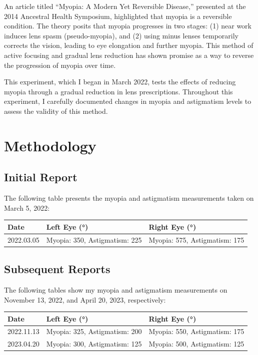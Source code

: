 \documentclass[12pt]{article}
\begin{document}
An article titled ``Myopia: A Modern Yet Reversible Disease,'' presented at the 2014 Ancestral Health Symposium, highlighted that myopia is a reversible condition. The theory posits that myopia progresses in two stages: (1) near work induces lens spasm (pseudo-myopia), and (2) using minus lenses temporarily corrects the vision, leading to eye elongation and further myopia. This method of active focusing and gradual lens reduction has shown promise as a way to reverse the progression of myopia over time.

This experiment, which I began in March 2022, tests the effects of reducing myopia through a gradual reduction in lens prescriptions. Throughout this experiment, I carefully documented changes in myopia and astigmatism levels to assess the validity of this method.

\section{Methodology}

\subsection{Initial Report}
The following table presents the myopia and astigmatism measurements taken on March 5, 2022:

\begin{tabularx}{\textwidth}{|X|X|X|}
\hline
\textbf{Date} & \textbf{Left Eye (°)} & \textbf{Right Eye (°)} \\
\hline
2022.03.05 & Myopia: 350, Astigmatism: 225 & Myopia: 575, Astigmatism: 175 \\
\hline
\end{tabularx}

\subsection{Subsequent Reports}
The following tables show my myopia and astigmatism measurements on November 13, 2022, and April 20, 2023, respectively:

\begin{tabularx}{\textwidth}{|X|X|X|}
\hline
\textbf{Date} & \textbf{Left Eye (°)} & \textbf{Right Eye (°)} \\
\hline
2022.11.13 & Myopia: 325, Astigmatism: 200 & Myopia: 550, Astigmatism: 175 \\
\hline
2023.04.20 & Myopia: 300, Astigmatism: 125 & Myopia: 500, Astigmatism: 125 \\
\hline
\end{tabularx}
\end{document}
